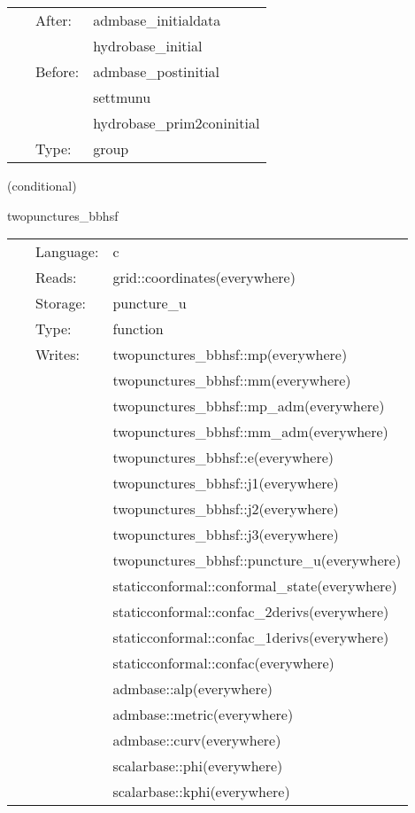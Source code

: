 \hspace{5mm}

 \begin{tabular*}{160mm}{cll} 
~ & After:  & admbase\_initialdata \\ 
~& ~ &hydrobase\_initial\\ 
~ & Before:  & admbase\_postinitial \\ 
~& ~ &settmunu\\ 
~& ~ &hydrobase\_prim2coninitial\\ 
~ & Type:  & group \\ 
\end{tabular*} 


\vspace{5mm}

   (conditional) 

\hspace{5mm} twopunctures\_bbhsf 

\hspace{5mm}{\it create puncture black hole initial data } 


\hspace{5mm}

 \begin{tabular*}{160mm}{cll} 
~ & Language:  & c \\ 
~ & Reads:  & grid::coordinates(everywhere) \\ 
~ & Storage:  & puncture\_u \\ 
~ & Type:  & function \\ 
~ & Writes:  & twopunctures\_bbhsf::mp(everywhere) \\ 
~& ~ &twopunctures\_bbhsf::mm(everywhere)\\ 
~& ~ &twopunctures\_bbhsf::mp\_adm(everywhere)\\ 
~& ~ &twopunctures\_bbhsf::mm\_adm(everywhere)\\ 
~& ~ &twopunctures\_bbhsf::e(everywhere)\\ 
~& ~ &twopunctures\_bbhsf::j1(everywhere)\\ 
~& ~ &twopunctures\_bbhsf::j2(everywhere)\\ 
~& ~ &twopunctures\_bbhsf::j3(everywhere)\\ 
~& ~ &twopunctures\_bbhsf::puncture\_u(everywhere)\\ 
~& ~ &staticconformal::conformal\_state(everywhere)\\ 
~& ~ &staticconformal::confac\_2derivs(everywhere)\\ 
~& ~ &staticconformal::confac\_1derivs(everywhere)\\ 
~& ~ &staticconformal::confac(everywhere)\\ 
~& ~ &admbase::alp(everywhere)\\ 
~& ~ &admbase::metric(everywhere)\\ 
~& ~ &admbase::curv(everywhere)\\ 
~& ~ &scalarbase::phi(everywhere)\\ 
~& ~ &scalarbase::kphi(everywhere)\\ 
\end{tabular*} 


